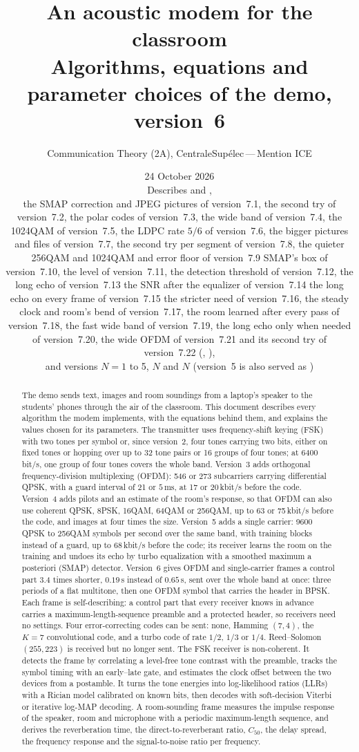\documentclass[11pt,a4paper]{article}
\title{\color{icemagenta}\textbf{An acoustic modem for the classroom}\\[4pt]
\large Algorithms, equations and parameter choices of the demo, version~6}
\author{Communication Theory (2A), CentraleSup\'elec\,---\,Mention ICE}
\date{24 October 2026\\[2pt]\small Describes \code{acoustic\_modem\_v6.html} and \code{audiocomm\_v6.py},\\ the SMAP correction and JPEG pictures of version~7.1, the second try of version~7.2, the polar codes of version~7.3, the wide band of version~7.4, the 1024QAM of version~7.5, the LDPC rate $5/6$ of version~7.6, the bigger pictures and files of version~7.7, the second try per segment of version~7.8, the quieter 256QAM and 1024QAM and error floor of version~7.9 SMAP's box of version~7.10, the level of version~7.11, the detection threshold of version~7.12, the long echo of version~7.13 the SNR after the equalizer of version~7.14 the long echo on every frame of version~7.15 the stricter need of version~7.16, the steady clock and room's bend of version~7.17, the room learned after every pass of version~7.18, the fast wide band of version~7.19, the long echo only when needed of version~7.20, the wide OFDM of version~7.21 and its second try of version~7.22 (\code{acoustic\_modem\_v7.html}, \code{audiocomm\_v7.py}),\\ and versions $N = 1$ to 5, \code{acoustic\_modem\_v}$N$\code{.html} and \code{audiocomm\_v}$N$\code{.py} (version~5 is also served as \code{acoustic\_modem.html})}
\newcommand{\ms}{\,\mathrm{ms}}
\theoremstyle{remark}
\begin{document}
\maketitle

\begin{abstract}
\noindent
The demo sends text, images and room soundings from a laptop's speaker to the students' phones through the air of the classroom.
This document describes every algorithm the modem implements, with the equations behind them, and explains the values chosen for its parameters.
The transmitter uses frequency-shift keying (FSK) with two tones per symbol or, since version~2, four tones carrying two bits, either on fixed tones or hopping over up to 32 tone pairs or 16 groups of four tones; at 6400 bit/s, one group of four tones covers the whole band.
Version~3 adds orthogonal frequency-division multiplexing (OFDM): 546 or 273 subcarriers carrying differential QPSK, with a guard interval of 21 or $5\ms$, at 17 or 20\,kbit/s before the code.
Version~4 adds pilots and an estimate of the room's response, so that OFDM can also use coherent QPSK, 8PSK, 16QAM, 64QAM or 256QAM, up to 63 or 75\,kbit/s before the code, and images at four times the size.
Version~5 adds a single carrier: 9600 QPSK to 256QAM symbols per second over the same band, with training blocks instead of a guard, up to 68\,kbit/s before the code; its receiver learns the room on the training and undoes its echo by turbo equalization with a smoothed maximum a posteriori (SMAP) detector.
Version~6 gives OFDM and single-carrier frames a control part 3.4 times shorter, $0.19$\,s instead of $0.65$\,s, sent over the whole band at once: three periods of a flat multitone, then one OFDM symbol that carries the header in BPSK.
Each frame is self-describing: a control part that every receiver knows in advance carries a maximum-length-sequence preamble and a protected header, so receivers need no settings.
Four error-correcting codes can be sent: none, Hamming $(7,4)$, the $K=7$ convolutional code, and a turbo code of rate $1/2$, $1/3$ or $1/4$.
Reed--Solomon $(255,223)$ is received but no longer sent.
The FSK receiver is non-coherent.
It detects the frame by correlating a level-free tone contrast with the preamble, tracks the symbol timing with an early--late gate, and estimates the clock offset between the two devices from a postamble.
It turns the tone energies into log-likelihood ratios (LLRs) with a Rician model calibrated on known bits, then decodes with soft-decision Viterbi or iterative log-MAP decoding.
A room-sounding frame measures the impulse response of the speaker, room and microphone with a periodic maximum-length sequence, and derives the reverberation time, the direct-to-reverberant ratio, $C_{50}$, the delay spread, the frequency response and the signal-to-noise ratio per frequency.

\end{abstract}
\end{document}
